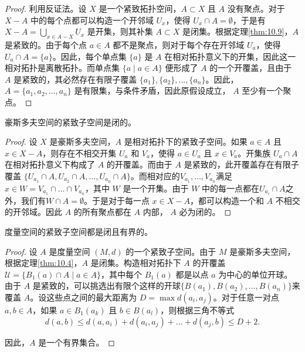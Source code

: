 \begin{proof}
	利用反证法。设 $X$ 是一个紧致拓扑空间，$A\subset X$ 且 $A$ 没有聚点。对于 $X-A$ 中的每个点都可以构造一个开邻域 $U_{x}$，使得 $U_{x} \cap A=\emptyset $，于是有$X-A=\bigcup _{x\in A-X} U_{x}$ 是开集，则其补集 $A\subset X$ 是闭集。根据定理\ref{thm:10.9}，$A$ 是紧致的。由于每个点 $a\in A$ 都不是聚点，则对于每个存在开邻域 $U_{a}$，使得 $U_{a} \cap A=\{a\}$。因此，每个单点集 $\{a\}$ 是 $A$ 在相对拓扑意义下的开集，因此这一相对拓扑是离散拓扑。而单点集 $\{a\mid a\in A\}$ 便形成了 $A$ 的一个开覆盖，且由于 $A$ 是紧致的，其必然存在有限子覆盖 $\{a_{1} \},\{a_{2} \},\dotsc ,\{a_{n} \}$。因此，$A=\{a_{1} ,a_{2} ,\dotsc ,a_{n} \}$ 是有限集，与条件矛盾，因此原假设成立， $A$ 至少有一个聚点。
\end{proof}

\begin{theorem}\label{thm:10.13} 
	豪斯多夫空间的紧致子空间是闭的。
\end{theorem}

\begin{proof}
设 $X$ 是豪斯多夫空间，$A$ 是相对拓扑下的紧致子空间。如果 $a\in A$ 且 $x\in X-A$，则存在不相交开集 $U_{a}$ 和 $V_{a}$，使得 $a\in U_{a}$ 且 $x\in V_{a}$。开集族 $U_{a} \cap A$ 在相对拓扑意义下构成了 $A$ 的开覆盖。而由于 $A$ 是紧致的，此开覆盖存在有限子覆盖 $\{U_{a_{1}} \cap A,U_{a_{2}} \cap A,\dotsc ,U_{a_{n}} \cap A\}$。而相对应的$V_{a_{1}} ,\dotsc ,V_{a_{n}}$满足$x\in W=V_{a_{1}} \cap \dotsc \cap V_{a_{n}}$，其中 $W$ 是一个开集。由于 $W$ 中的每一点都在$U_{a_{i}} \cap A$之外，我们有$W\cap A=\emptyset $。于是对于每一点 $x\in X-A$，都可以构造一个和 $A$ 不相交的开邻域。因此 $A$ 的所有聚点都在 $A$ 内部， $A$ 必为闭的。
\end{proof}

\begin{theorem}\label{thm:10.14} 
	度量空间的紧致子空间都是闭且有界的。
\end{theorem}

\begin{proof}
	设 $A$ 是度量空间 $(M,d)$ 的一个紧致子空间。由于 $M$ 是豪斯多夫空间，根据定理\ref{thm:10.4}，$A$ 是闭集。构造相对拓扑下 $A$ 的开覆盖$\mathcal{U} =\{B_{1} (a)\cap A\mid a\in A\}$，其中每个 $B_{1} (a)$ 都是以点 $a$ 为中心的单位开球。由于 $A$ 是紧致的，可以挑选出有限个这样的开球$\{B(a_{1} ),B(a_{2} ),\dotsc ,B(a_{n} )\}$来覆盖 $A$。设这些点之间的最大距离为 $D=\max d(a_{i} ,a_{j} )$。对于任意一对点 $a,b\in A$，如果 $a\in B_{1} (a_{k} )$ 且 $b\in B(a_{l} )$，则根据三角不等式
\begin{equation*}
d(a,b)\leq d(a,a_{i} )+d(a_{i} ,a_{j} )+\dotsc +d(a_{j} ,b)\leq D+2.
\end{equation*}

因此，$A$ 是一个有界集合。
\end{proof}

